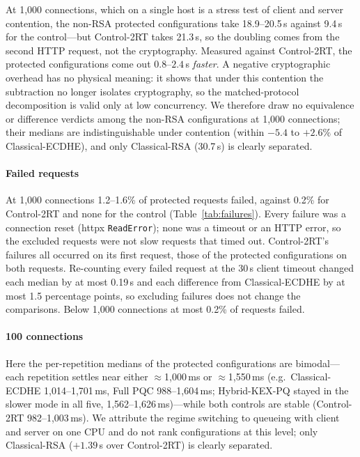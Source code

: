 \documentclass[conference]{IEEEtran}
\begin{document}
At 1,000 connections, which on a single host is a stress test of client and server contention, the
non-RSA protected configurations take 18.9--20.5\,s against 9.4\,s for the control---but Control-2RT takes
21.3\,s, so the doubling comes from the second HTTP request, not the cryptography. Measured against
Control-2RT, the protected configurations come out $0.8$--$2.4$\,s \emph{faster}. A negative cryptographic
overhead has no physical meaning: it shows that under this contention the subtraction no longer isolates
cryptography, so the matched-protocol decomposition is valid only at low concurrency. We therefore draw
no equivalence or difference verdicts among the non-RSA configurations at 1,000 connections; their
medians are indistinguishable under contention (within $-5.4$ to $+2.6\%$ of Classical-ECDHE), and only
Classical-RSA (30.7\,s) is clearly separated.

\paragraph*{Failed requests} At 1,000 connections 1.2--1.6\% of protected requests failed, against 0.2\%
for Control-2RT and none for the control (Table~\ref{tab:failures}). Every failure was a connection reset
(httpx \texttt{ReadError}); none was a timeout or an HTTP error, so the excluded requests were not slow
requests that timed out. Control-2RT's failures all occurred on its first request, those of the protected
configurations on both requests. Re-counting every failed request at the 30\,s client timeout changed
each median by at most 0.19\,s and each difference from Classical-ECDHE by at most 1.5 percentage
points, so excluding failures does not change the comparisons. Below 1,000 connections at most 0.2\% of requests failed.

\paragraph*{100 connections} Here the per-repetition medians of the protected configurations are
bimodal---each repetition settles near either $\approx$1,000\,ms or $\approx$1,550\,ms (e.g.\ Classical-ECDHE
1,014--1,701\,ms, Full PQC 988--1,604\,ms; Hybrid-KEX-PQ stayed in the slower mode in all five,
1,562--1,626\,ms)---while both controls are stable (Control-2RT 982--1,003\,ms). We attribute the regime
switching to queueing with client and server on one CPU and do not rank configurations at this level;
only Classical-RSA ($+1.39$\,s over Control-2RT) is clearly separated.
\end{document}
